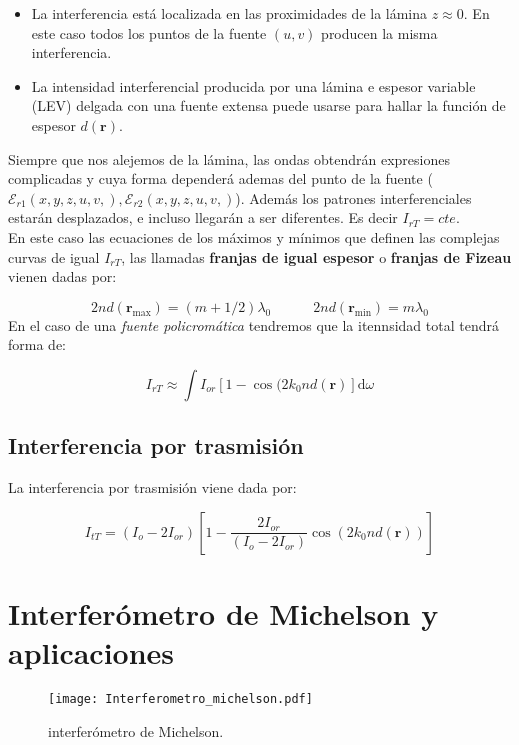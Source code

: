 \documentclass[12pt,a4paper]{book}
\numberwithin{equation}{section}
\numberwithin{figure}{section}
\newcommand{\tquad}{\quad \quad \quad}
\newcommand{\ccorchetes}[1]{\left[ #1  \right]}
\newcommand{\D}{\mathrm{d}}
\newcommand{\1}{_{(1)}}
\newcommand{\2}{_{(2)}}
\newcommand{\rn}{\mathbf{r}}
\newcommand{\Ecal}{\mathcal{E}}
\theoremstyle{definition}
\begin{document}
\begin{itemize}
\item La interferencia está localizada en las proximidades de la lámina $z\approx0$. En este caso todos los puntos de la fuente $(u,v)$ producen la misma interferencia. \\
\item La intensidad interferencial producida por una lámina e espesor variable (LEV) delgada con una fuente extensa puede usarse para hallar la función de espesor $d(\rn)$. 
\end{itemize}
Siempre que nos alejemos de la lámina, las ondas obtendrán expresiones complicadas y cuya forma dependerá ademas del punto de la fuente ($\Ecal_{r1}(x,y,z,u,v,),\Ecal_{r2}(x,y,z,u,v,)$). Además los patrones interferenciales estarán desplazados, e incluso llegarán a ser diferentes. Es decir $I_{rT} = cte$. \\

En este caso las ecuaciones de los máximos y mínimos que definen las complejas curvas de igual $I_{rT}$, las llamadas \textbf{franjas de igual espesor} o \textbf{franjas de Fizeau} vienen dadas por:

\begin{equation}
2nd (\rn_{\max}) = (m+1/2)\lambda_0 \tquad 2nd(\rn_{\min}) = m \lambda_0
\end{equation}
En el caso de una \textit{fuente policromática} tendremos que la itennsidad total tendrá forma de:

\begin{equation}
I_{rT} \approx \int I_{or} \ccorchetes{1-\cos (2k_0nd(\rn)} \D \omega
\end{equation}

\subsection{Interferencia por trasmisión}

La interferencia por trasmisión viene dada por:

\begin{equation}
I_{tT} = (I_o - 2I_{or}) \ccorchetes{1- \frac{2I_{or}}{(I_o-2I_{or})}\cos (2k_0nd(\rn))}
\end{equation}


\section{Interferómetro de Michelson y aplicaciones}

\begin{figure}[h!] \centering
\texttt{[image: Interferometro\_michelson.pdf]}
\caption{interferómetro de Michelson.}
\label{Fig:03.3-01}
\end{figure}
\end{document}
